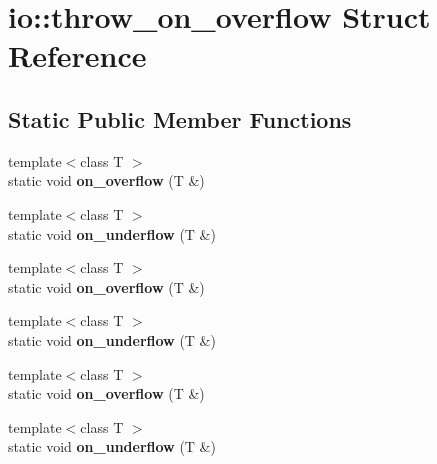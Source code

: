 \hypertarget{structio_1_1throw__on__overflow}{}\section{io\+:\+:throw\+\_\+on\+\_\+overflow Struct Reference}
\label{structio_1_1throw__on__overflow}
\subsection*{Static Public Member Functions}
\begin{DoxyCompactItemize}
\item 
\mbox{\label{structio_1_1throw__on__overflow_a0a59c1dc2ead1a9275c62885ec7545d2}} 
{\footnotesize template$<$class T $>$ }\\static void {\bfseries on\+\_\+overflow} (T \&)
\item 
\mbox{\label{structio_1_1throw__on__overflow_a2ae91b1ae3d655c16f7e6a7e9a1abd92}} 
{\footnotesize template$<$class T $>$ }\\static void {\bfseries on\+\_\+underflow} (T \&)
\item 
\mbox{\label{structio_1_1throw__on__overflow_a0a59c1dc2ead1a9275c62885ec7545d2}} 
{\footnotesize template$<$class T $>$ }\\static void {\bfseries on\+\_\+overflow} (T \&)
\item 
\mbox{\label{structio_1_1throw__on__overflow_a2ae91b1ae3d655c16f7e6a7e9a1abd92}} 
{\footnotesize template$<$class T $>$ }\\static void {\bfseries on\+\_\+underflow} (T \&)
\item 
\mbox{\label{structio_1_1throw__on__overflow_a0a59c1dc2ead1a9275c62885ec7545d2}} 
{\footnotesize template$<$class T $>$ }\\static void {\bfseries on\+\_\+overflow} (T \&)
\item 
\mbox{\label{structio_1_1throw__on__overflow_a2ae91b1ae3d655c16f7e6a7e9a1abd92}} 
{\footnotesize template$<$class T $>$ }\\static void {\bfseries on\+\_\+underflow} (T \&)
\end{DoxyCompactItemize}


